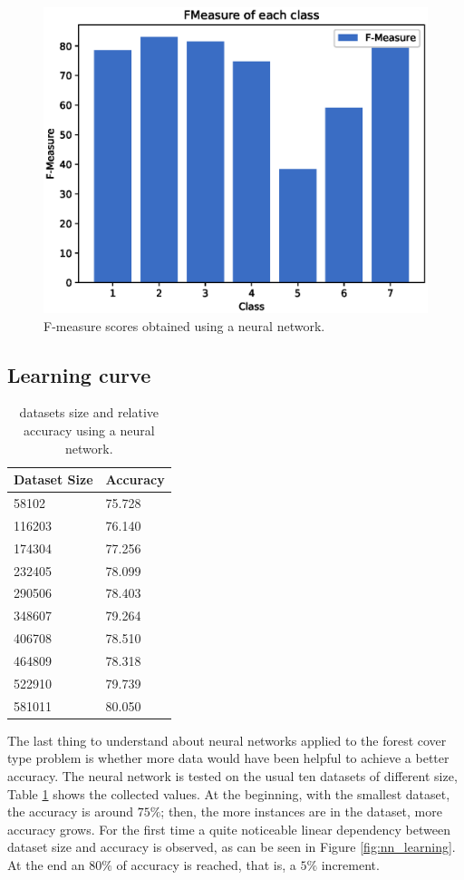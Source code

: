 \documentclass[a4paper, 10pt]{article}
\begin{document}
\begin{figure}[H]
 \centering
 \includegraphics[width=0.8\linewidth]{pictures/nn_fmeasure.eps}
 \caption{F-measure scores obtained using a neural network.}
 \label{fig:nn_fmeasure}
\end{figure}


\subsection{Learning curve}

\begin{table}[H]
\centering
\begin{tabular}{|l|l|}
\hline
\textbf{Dataset Size} & \textbf{Accuracy}\\\hline
58102 & 75.728\\\hline
116203 & 76.140\\\hline
174304 & 77.256\\\hline
232405 & 78.099\\\hline
290506 & 78.403\\\hline
348607 & 79.264\\\hline
406708 & 78.510\\\hline
464809 & 78.318\\\hline
522910 & 79.739\\\hline
581011 & 80.050\\\hline
\end{tabular}
\caption{datasets size and relative accuracy using a neural network.}
\label{tab:nn_learning}
\end{table}

The last thing to understand about neural networks applied to the forest cover type problem is whether more data would have been helpful to achieve a better accuracy. The neural network is tested on the usual ten datasets of different size, Table \ref{tab:nn_learning} shows the collected values. At the beginning, with the smallest dataset,  the accuracy is around $75\%$; then, the more instances are in the dataset, more accuracy grows. For the first time a quite noticeable linear dependency between dataset size and accuracy is observed, as can be seen in Figure \ref{fig:nn_learning}. At the end an $80\%$ of accuracy is reached, that is, a $5\%$ increment.
\end{document}
